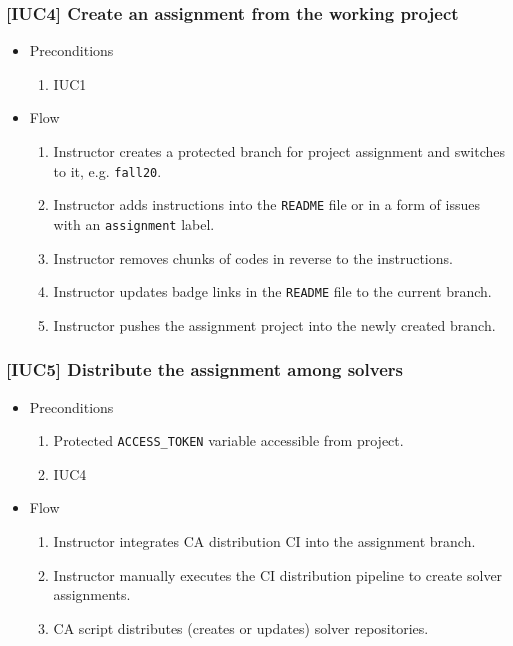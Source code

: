 \subsubsection{{[}IUC4{]} Create an assignment from the working project}

\begin{itemize}
\item
  {Preconditions}
    \begin{enumerate}
    \item
      {IUC1}
    \end{enumerate}
\end{itemize}

\begin{itemize}
\item
  {Flow}
    \begin{enumerate}
    \item
      {Instructor creates a protected branch for project assignment and switches to it, e.g. \texttt{fall20}.}
    \item
      {Instructor adds instructions into the \texttt{README} file or in a form of issues with an \texttt{assignment} label.}
    \item
      {Instructor removes chunks of codes in reverse to the instructions.}
    \item
      {Instructor updates badge links in the \texttt{README} file to the current branch.}
    \item
      {Instructor pushes the assignment project into the newly created branch.}
    \end{enumerate}
\end{itemize}

\subsubsection{{[}IUC5{]} Distribute the assignment among solvers}

\begin{itemize}
\item
  {Preconditions}
    \begin{enumerate}
    \item
      {Protected \texttt{ACCESS\_TOKEN} variable accessible from project.}
    \item
      {IUC4}
    \end{enumerate}
\end{itemize}

\begin{itemize}
\item
  {Flow}
    \begin{enumerate}
    \item
      {Instructor integrates CA distribution CI into the assignment branch.}
    \item
      {Instructor manually executes the CI distribution pipeline to create solver assignments.}
    \item
      {CA script distributes (creates or updates) solver repositories.}
    \end{enumerate}
\end{itemize}

